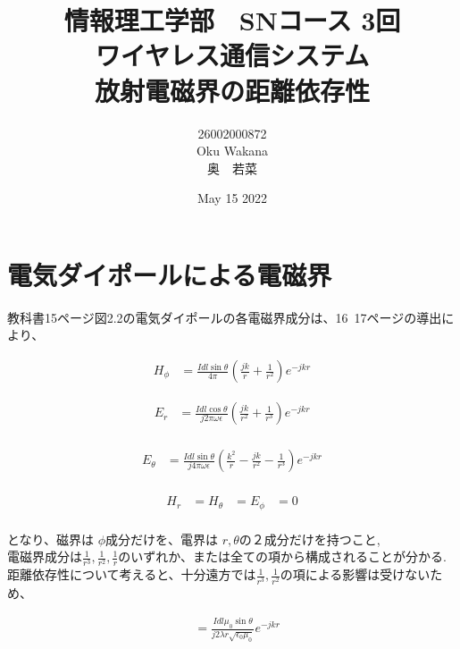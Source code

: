 \documentclass[dvipdfmx,autodetect-engine,titlepage]{jsarticle}
\title{情報理工学部　SNコース 3回\\
ワイヤレス通信システム\\
放射電磁界の距離依存性}
\author{26002000872\\Oku Wakana\\奥　若菜}
\date{May 15 2022}
\begin{document}
\maketitle

\section{電気ダイポールによる電磁界}
教科書15ページ図2.2の電気ダイポールの各電磁界成分は、16~17ページの導出により、

\begin{align*}
  H_{\phi } &= \frac{Idl\sin \theta }{4\pi}(\frac{jk}{r}+\frac{1}{r^2})e^{-jkr} \tag*{2・18}
\end{align*}

\begin{align*}
  E_{r} &= \frac{Idl\cos \theta }{j2\pi \omega \epsilon}(\frac{jk}{r^2}+\frac{1}{r^3})e^{-jkr} \\ \tag*{2・19}
\end{align*}

\begin{align*}
  E_{\theta } &= \frac{Idl\sin \theta }{j4\pi \omega \epsilon}(\frac{k^2}{r}-\frac{jk}{r^2}-\frac{1}{r^3})e^{-jkr} \\ \tag*{2・20}
\end{align*}

\begin{align*}
  H_{r} &= H_{\theta} &= E_{\phi } &= 0 \\ \tag*{2・21}
\end{align*}

となり、磁界は \begin{math}\phi \end{math}成分だけを、電界は \begin{math} r,\theta \end{math}の２成分だけを持つこと,\\
電磁界成分は\begin{math}\frac{1}{r^3},\frac{1}{r^2},\frac{1}{r}\end{math}のいずれか、または全ての項から構成されることが分かる.\\
距離依存性について考えると、十分遠方では\begin{math}\frac{1}{r^3},\frac{1}{r^2}\end{math}の項による影響は受けないため、

\begin{align*}
  &= \frac{Idl \mu_0 \sin \theta }{j2\lambda r \sqrt{\epsilon _{0}\mu _0 }}e^{-jkr}\\
\end{align*}
\end{document}

